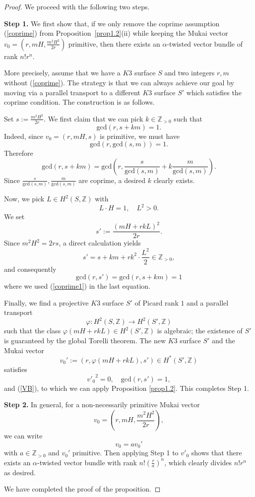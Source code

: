 \documentclass[11pt]{amsart}
\theoremstyle{plain}
\theoremstyle{definition}
\theoremstyle{remark}
\newcommand{\BZ}{{\mathbb{Z}}}
\begin{document}
\begin{proof} We proceed with the following two steps.
\medskip

{\bf \noindent Step 1.} We first show that, if we only remove the coprime assumption (\ref{coprime}) from Proposition~\ref{prop1.2}(ii) while keeping the Mukai vector $v_0 = \left(r, mH, \frac{m^2H^2}{2r}\right)$ primitive, then there exists an $\alpha$-twisted vector bundle of rank $n!r^n$.

More precisely, assume that we have a $K3$ surface $S$ and two integers $r,m$ without (\ref{coprime}). The strategy is that we can always achieve our goal by moving via a parallel transport to a different $K3$ surface $S'$ which satisfies the coprime condition. The construction is as follows.

Set $s:= \frac{m^2H^2}{2r}$. We first claim that we can pick $k\in \BZ_{>0}$ such that
\begin{equation}\label{coprime1}
\mathrm{gcd}(r, s+km)=1.
\end{equation}
Indeed, since $v_0=(r, mH, s)$ is primitive, we must have
\[
\mathrm{gcd}\left(r, \mathrm{gcd}(s,m)\right)=1.
\]
Therefore
\[
\mathrm{gcd}(r, s+km) = \mathrm{gcd}\left(r, \frac{s}{\mathrm{gcd}(s,m)}+k\frac{m}{\mathrm{gcd}(s,m)}\right). 
\]
Since $\frac{s}{\mathrm{gcd}(s,m)}, \frac{m}{\mathrm{gcd}(s,m)}$ are coprime, a desired $k$ clearly exists.


Now, we pick $L\in H^2(S,\BZ)$ with 
\[
L\cdot H=1, \quad L^2 >0.
\]
We set
\[
s':= \frac{(mH+rkL)^2}{2r}.  
\]
Since $m^2H^2 = 2rs$, a direct calculation yields
\[
s' = s + km + rk^2\cdot \frac{L^2}{2} \in \BZ_{>0},
\]
and consequently
\[
\mathrm{gcd}(r, s') = \mathrm{gcd}(r, s+km) =1
\]
where we used (\ref{coprime1}) in the last equation.

Finally, we find a projective $K3$ surface $S'$ of Picard rank $1$ and a parallel transport 
\[
\varphi: H^2(S, \BZ) \to H^2(S', \BZ)
\]
such that the class $\varphi(mH+rkL) \in H^2(S', \BZ)$ is algebraic; the existence of $S'$ is guaranteed by the global Torelli theorem. The new $K3$ surface $S'$ and the Mukai vector
\[
v_0':= (r, \varphi(mH+rkL), s') \in H^*(S', \BZ)
\]
satisfies 
\[
{v'_0}^2 = 0, \quad \mathrm{gcd}(r,s')=1,
\]
and (\ref{VB}), to which we can apply Proposition \ref{prop1.2}. This completes Step 1.
\medskip

{\noindent \bf Step 2.} In general, for a non-necessarily primitive Mukai vector
\[
v_0 = \left(r, mH, \frac{m^2H^2}{2r}\right),
\]
we can write
\[
v_0 = a v_0'
\]
with $a\in\BZ_{>0}$ and $v_0'$ primitive. Then applying Step 1 to $v'_0$ shows that there exists an $\alpha$-twisted vector bundle with rank $n! \left(\frac{r}{a}\right)^n$, which clearly divides $n!r^n$ as desired.

We have completed the proof of the proposition.
\end{proof}
\end{document}
